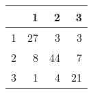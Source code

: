 \begin{tabular}{rrrr}
  \hline
 & 1 & 2 & 3 \\ 
  \hline
1 &  27 &   3 &   3 \\ 
  2 &   8 &  44 &   7 \\ 
  3 &   1 &   4 &  21 \\ 
   \hline
\end{tabular}
